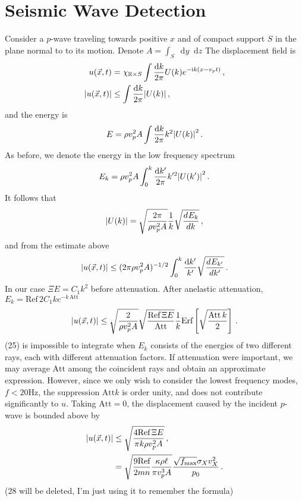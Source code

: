 \documentclass[prd,reprint,10pt]{revtex4-1}
\newcommand*\diff{\mathop{}\!\mathrm{d}}
\newcommand*\R{\mathbb R}
\newcommand*\te[1]{\text{#1}}
\newcommand*\ps[1]{\left[#1\right]}
\newcommand*\f[2]{\frac{#1}{#2}}
\newcommand*\I{\te{i}}
\newcommand*\td[3]{\frac{d^{#3}#1}{d #2^{#3}}}
\begin{document}
\section{Seismic Wave Detection}
Consider a $p$-wave traveling towards positive $x$ and of compact support $S$ in the plane normal to to its motion. Denote $A =\int_S\diff y\diff z$ The displacement field is
\begin{align}
u(\vec x,t) &= \chi_{\R\times S}\int\f{\diff k}{2\pi}U(k)e^{-\I k(x-v_p t)}\,,\\
\abs{u(\vec x,t)}&\leq\int\f{\diff k}{2\pi}\abs{U(k)}\,,
\end{align}
and the energy is
\begin{align}
E = \rho v_p^2 A\int\f{\diff k}{2\pi}k^2\abs{U(k)}^2\,.
\end{align}
As before, we denote the energy in the low frequency spectrum
\begin{align}
E_k = \rho v_p^2 A\int_0^k\f{\diff k'}{2\pi}k'^2\abs{U(k')}^2\,.
\end{align}
It follows that
\begin{align}
\abs{U(k)} = \sqrt{\f{2\pi}{\rho v_p^2 A}}\f1k\sqrt{\td{E_k}{k}{}}\,,
\end{align}
and from the estimate above
\begin{align}
\abs{u(\vec x,t)}\leq(2\pi\rho v_p^2 A)^{-1/2}\int_0^k\f{\diff k'}{k'}\sqrt{\td{E_{k'}}{k'}{}}\,.
\end{align}
In our case $\Xi E= C_1 k^2$ before attenuation. After anelastic attenuation, $E_k =\te{Ref}\,2C_1 k e^{-k\,\te{Att}}$
\begin{align}
\abs{u(\vec x,t)}\leq\sqrt{\f{2}{\rho v_p^2 A}}\sqrt{\f{\te{Ref}\,\Xi E}{\te{Att}}}\f1k\te{Erf}\ps{\sqrt{\f{\te{Att}\,k}{2}}}\,.
\end{align}
(25) is impossible to integrate when $E_k$ consists of the energies of two different rays, each with different attenuation factors. If attenuation were important, we may average $\te{Att}$ among the coincident rays and obtain an approximate expression. However, since we only wish to consider the lowest frequency modes, $f<20\te{Hz}$, the suppression $\te{Att} k$ is order unity, and does not contribute significantly to $u$. Taking $\te{Att} = 0$, the displacement caused by the incident $p$-wave is bounded above by
\begin{align}
\abs{u(\vec x,t)}&\leq\sqrt{\f{4\te{Ref}\,\Xi E}{\pi k\rho v_p^2 A}}\,,\\
&=\sqrt{\f{9\te{Ref}}{2mn}\f{\kappa\rho\ell}{\pi v_p^3A}}\f{\sqrt{ f_\te{max}}\sigma_Xv_X^2}{p_0}\,.
\end{align}
(28 will be deleted, I'm just using it to remember the formula)
\end{document}
